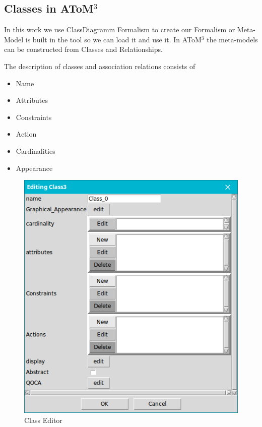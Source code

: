 \subsection{Classes in AToM$^{3}$ }
In this work we use ClassDiagramm Formalism to create  our Formalism 
or Meta-Model is built in the tool so we can load it and use  it\cite{ch3-meta2}.
In AToM$^{3}$ the meta-models can be constructed from Classes and
Relationships.

The description of classes and association relations consists of

\begin{itemize}
\newcommand{\localtextbulletone}{\textcolor{gray}{\raisebox{.45ex}{\rule{.6ex}{.6ex}}}}
\renewcommand{\labelitemi}{\localtextbulletone}
\item  Name
\item  Attributes
\item  Constraints
\item  Action
\item  Cardinalities
\item  Appearance
\end{itemize}

\begin{figure}[th]
	\centering
		\includegraphics[scale=0.4]{ch3/img/class}
	\caption{\label{fig:Class Editor}Class Editor}
\end{figure} 

